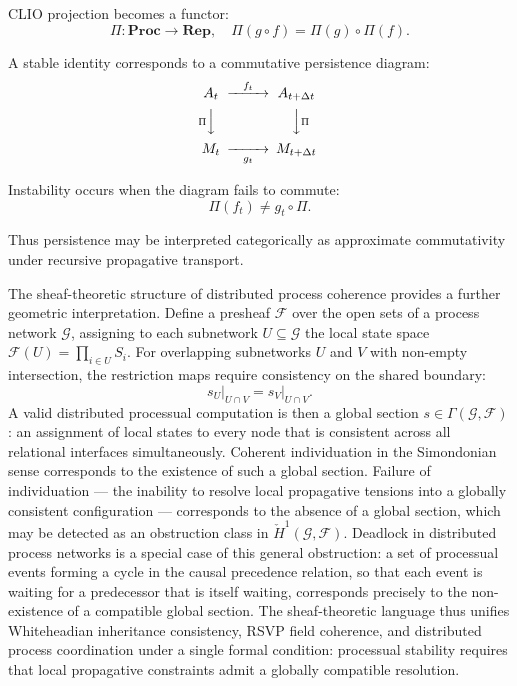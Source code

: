 \documentclass[12pt,a4paper]{article}
\begin{document}
CLIO projection becomes a functor:
\[
\Pi : \mathbf{Proc}\to\mathbf{Rep},
\quad
\Pi(g\circ f)
=
\Pi(g)\circ\Pi(f).
\]

A stable identity corresponds to a commutative persistence diagram:
\[
\begin{CD}
A_t @>f_t>> A_{t+\Delta t} \\
@V\Pi VV @VV\Pi V \\
M_t @>>g_t> M_{t+\Delta t}
\end{CD}
\]

Instability occurs when the diagram fails to commute:
\[
\Pi(f_t)\neq g_t\circ\Pi.
\]

Thus persistence may be interpreted categorically as approximate commutativity under recursive propagative transport.

The sheaf-theoretic structure of distributed process coherence provides a further geometric interpretation. Define a presheaf \(\mathcal{F}\) over the open sets of a process network \(\mathcal{G}\), assigning to each subnetwork \(U \subseteq \mathcal{G}\) the local state space \(\mathcal{F}(U) = \prod_{i \in U} S_i\). For overlapping subnetworks \(U\) and \(V\) with non-empty intersection, the restriction maps require consistency on the shared boundary:
\[
s_U\big|_{U \cap V} = s_V\big|_{U \cap V}.
\]
A valid distributed processual computation is then a global section \(s \in \Gamma(\mathcal{G}, \mathcal{F})\): an assignment of local states to every node that is consistent across all relational interfaces simultaneously. Coherent individuation in the Simondonian sense corresponds to the existence of such a global section. Failure of individuation — the inability to resolve local propagative tensions into a globally consistent configuration — corresponds to the absence of a global section, which may be detected as an obstruction class in \(\check{H}^1(\mathcal{G}, \mathcal{F})\). Deadlock in distributed process networks is a special case of this general obstruction: a set of processual events forming a cycle in the causal precedence relation, so that each event is waiting for a predecessor that is itself waiting, corresponds precisely to the non-existence of a compatible global section. The sheaf-theoretic language thus unifies Whiteheadian inheritance consistency, RSVP field coherence, and distributed process coordination under a single formal condition: processual stability requires that local propagative constraints admit a globally compatible resolution.
\end{document}
